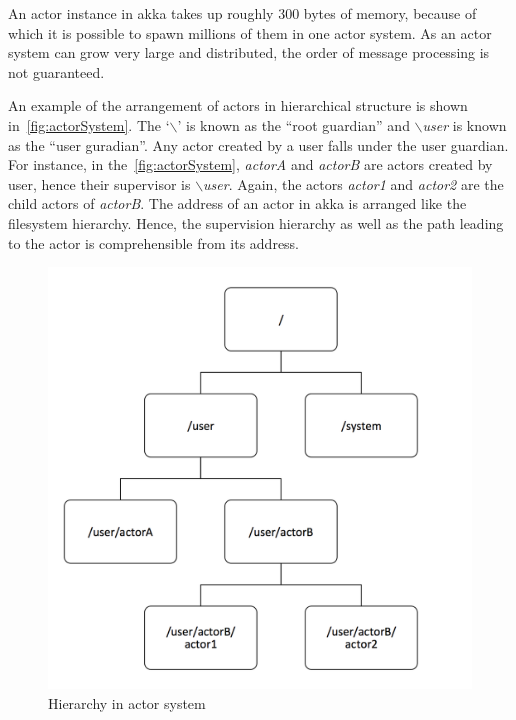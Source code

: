   An actor instance in akka takes up roughly 300 bytes of memory, because of which it is possible to spawn millions of them in one actor system. As an actor system can grow very large and distributed, the order of message processing is not guaranteed.~\cite{akkaJavaDoc}

  An example of the arrangement of actors in hierarchical structure is shown in~\autoref{fig:actorSystem}. The ‘{$\backslash$}’ is known as the “root guardian” and \emph{$\backslash$user} is known as the “user guradian”. Any actor created by a user falls under the user guardian. For instance, in the~\autoref{fig:actorSystem}, \emph{actorA} and \emph{actorB} are actors created by user, hence their supervisor is \emph{$\backslash$user}. Again, the actors \emph{actor1} and \emph{actor2} are the child actors of \emph{actorB}. The address of an actor in akka is arranged like the filesystem hierarchy. Hence, the supervision hierarchy as well as the path leading to the actor is comprehensible from its address.

\begin{figure}[H]
  \centering
  \includegraphics[scale=0.5]{figures/actorSystem}
  \caption[Hierarchy in actor system]{Hierarchy in actor system~\cite{akkaJavaDoc}}
  \label{fig:actorSystem}
\end{figure}

